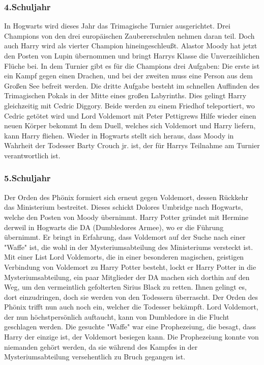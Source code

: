 \documentclass[a4paper, 10pt]{article}
\begin{document}
\subsubsection*{\large 4.Schuljahr}
In Hogwarts wird dieses Jahr das Trimagische Turnier ausgerichtet. Drei Champions von den drei europäischen Zaubererschulen nehmen daran teil. Doch auch Harry wird als vierter Champion hineingeschleußt.
\vspace{10pt}
\newline
Alastor Moody hat jetzt den Posten von Lupin übernommen und bringt Harrys Klasse die Unverzeihlichen Flüche bei.
\vspace{10pt}
\newline
In dem Turnier gibt es für die Champions drei Aufgaben: Die erste ist ein Kampf gegen einen Drachen, und bei der zweiten muss eine Person aus dem Großen See befreit werden. Die dritte Aufgabe besteht im schnellen Auffinden des Trimagischen Pokals in der Mitte eines großen Labyrinths. Dies gelingt Harry gleichzeitig mit Cedric Diggory. Beide werden zu einem Friedhof teleportiert, wo Cedric getötet wird und Lord Voldemort mit Peter Pettigrews Hilfe wieder einen neuen Körper bekommt
\vspace{10pt}
\newline
In dem Duell, welches sich Voldemort und Harry liefern, kann Harry fliehen. Wieder in Hogwarts stellt sich heraus, dass Moody in Wahrheit der Todesser Barty Crouch jr. ist, der für Harrys Teilnahme am Turnier verantwortlich ist.
\subsubsection*{\large 5.Schuljahr}
Der Orden des Phönix formiert sich erneut gegen Voldemort, dessen Rückkehr das Ministerium bestreitet. Dieses schickt Dolores Umbridge nach Hogwarts, welche den Posten von Moody übernimmt.
\vspace{10pt}
\newline
Harry Potter gründet mit Hermine derweil in Hogwarts die DA (Dumbledores Armee), wo er die Führung übernimmt. Er bringt in Erfahrung, dass Voldemort auf der Suche nach einer "Waffe" ist, die wohl in der Mysteriumsabteilung des Ministeriums versteckt ist.
\vspace{10pt}
\newline
Mit einer List Lord Voldemorts, die in einer besonderen magischen, geistigen Verbindung von Voldemort zu Harry Potter besteht, lockt er Harry Potter in die Mysteriumsabteilung, ein paar Mitglieder der DA machen sich dorthin auf den Weg, um den vermeintlich gefolterten Sirius Black zu retten. Ihnen gelingt es, dort einzudringen, doch sie werden von den Todessern überrascht. Der Orden des Phönix trifft nun auch noch ein, welcher die Todesser bekämpft. Lord Voldemort, der nun höchstpersönlich auftaucht, kann von Dumbledore in die Flucht geschlagen werden.
\vspace{10pt}
\newline
Die gesuchte "Waffe" war eine Prophezeiung, die besagt, dass Harry der einzige ist, der Voldemort besiegen kann. Die Prophezeiung konnte von niemanden gehört werden, da sie während des Kampfes in der Mysteriumsabteilung versehentlich zu Bruch gegangen ist.
\end{document}
